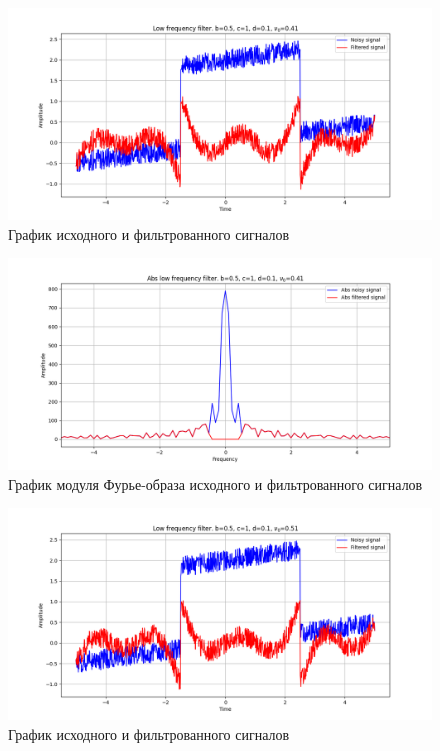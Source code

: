 \documentclass[a4paper, 12pt]{article}
\begin{document}
    \begin{figure}[!htb]
        \centering
        \includegraphics[scale=0.485]{4_u_flt_u_nolow.png}
        \captionsetup{skip=0pt}
        \caption{График исходного и фильтрованного сигналов}
        \label{fig:fig33}
    \end{figure}
    \begin{figure}[!htb]
        \centering
        \includegraphics[scale=0.485]{4_abs_u_U_nolow.png}
        \captionsetup{skip=0pt}
        \caption{График модуля Фурье-образа исходного и фильтрованного сигналов}
        \label{fig:fig34}
    \end{figure}
    \begin{figure}[!htb]
        \centering
        \includegraphics[scale=0.485]{5_u_flt_u_nolow.png}
        \captionsetup{skip=0pt}
        \caption{График исходного и фильтрованного сигналов}
        \label{fig:fig35}
    \end{figure}
\end{document}
